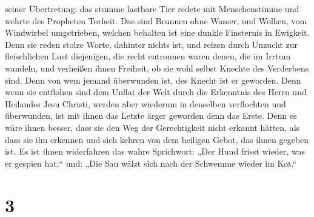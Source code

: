 seiner Übertretung: das stumme lastbare Tier redete mit Menschenstimme
und wehrte des Propheten Torheit.  Das sind Brunnen ohne
Wasser, und Wolken, vom Windwirbel umgetrieben, welchen behalten ist
eine dunkle Finsternis in Ewigkeit.  Denn sie reden
stolze Worte, dahinter nichts ist, und reizen durch Unzucht zur
fleischlichen Lust diejenigen, die recht entronnen waren denen, die im
Irrtum wandeln,  und verheißen ihnen Freiheit, ob sie
wohl selbst Knechte des Verderbens sind. Denn von wem jemand überwunden
ist, des Knecht ist er geworden.  Denn wenn sie entflohen
sind dem Unflat der Welt durch die Erkenntnis des Herrn und Heilandes
Jesu Christi, werden aber wiederum in denselben verflochten und
überwunden, ist mit ihnen das Letzte ärger geworden denn das Erste.
 Denn es wäre ihnen besser, dass sie den Weg der
Gerechtigkeit nicht erkannt hätten, als dass sie ihn erkennen und sich
kehren von dem heiligen Gebot, das ihnen gegeben ist.  Es
ist ihnen widerfahren das wahre Sprichwort: „Der Hund frisst wieder, was
er gespien hat;`` und: „Die Sau wälzt sich nach der Schwemme wieder im
Kot.``

\hypertarget{section-2}{%
\section{3}\label{section-2}}

